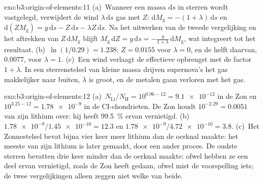 \begin{solution}{exo:b3:origin-of-elements:11}
(a)~Wanneer een massa $\mathrm{d}s$ in sterren wordt vastgelegd, verwijdert de wind
$\lambda\,\mathrm{d}s$ gas met  $Z$:
$\mathrm{d}M_\mathrm{g} = -(1 + \lambda)\,\mathrm{d}s$ en
$\mathrm{d}(ZM_\mathrm{g}) = y\,\mathrm{d}s - Z\,\mathrm{d}s -
\lambda Z\,\mathrm{d}s$. Na het uitwerken van de tweede vergelijking en het aftrekken van
$Z\,\mathrm{d}M_\mathrm{g}$ blijft $M_\mathrm{g}\,\mathrm{d}Z =
y\,\mathrm{d}s = -\frac{y}{1 + \lambda}\,\mathrm{d}M_\mathrm{g}$, wat
integreert tot het resultaat. (b)~$\ln(1/0.29) = 1.238$: $Z = 0.0155$ voor
$\lambda = 0$, en de helft daarvan, $0.0077$, voor $\lambda = 1$. (c)~Een wind
verlaagt de effectieve opbrengst met de factor $1 + \lambda$. In een sterrenstelsel
van kleine massa drijven supernova's het gas makkelijker naar buiten, $\lambda$ is groot,
en de metalen gaan verloren met het gas.
\end{solution}

\begin{solution}{exo:b3:origin-of-elements:12}
(a)~$N_\mathrm{Li}/N_\mathrm{H} = 10^{0.96 - 12} = \num{9.1e-12}$ in de
Zon en $10^{3.25 - 12} = \num{1.78e-9}$ in de CI-chondrieten. De Zon
houdt $10^{-2.29} = \num{0.0051}$ van zijn lithium over: hij heeft
\qty{99.5}{\percent} ervan vernietigd. (b)~$\num{1.78e-9}/\num{1.45e-10} = 12.3$ en
$\num{1.78e-9}/\num{4.72e-10} = 3.8$. (c)~Het Zonnestelsel bevat bijna
vier keer meer lithium dan de oerknal maakte: het meeste van zijn lithium
is later gemaakt, door een ander proces. De oudste sterren bevatten drie keer
minder dan de oerknal maakte: ofwel hebben ze een deel ervan vernietigd, zoals
de Zon heeft gedaan, ofwel mist de voorspelling iets; de twee vergelijkingen
alleen zeggen niet welke van beide.
\end{solution}

